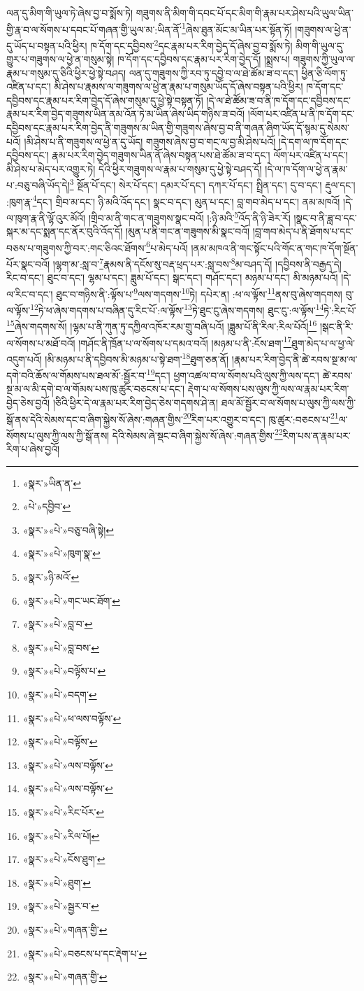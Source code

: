 ལན་དུ་མིག་གི་ཡུལ་ཏེ་ཞེས་བྱ་བ་སྨོས་ཏེ། གཟུགས་ནི་མིག་གི་དབང་པོ་དང་མིག་གི་རྣམ་པར་ཤེས་པའི་ཡུལ་ཡིན་གྱི་རྣ་བ་ལ་སོགས་པ་དབང་པོ་གཞན་གྱི་ཡུལ་མ་:ཡིན་ནོ་\footnote{«སྣར་»ཡིན་ན་}ཞེས་ཐུན་མོང་མ་ཡིན་པར་སྟོན་ཏོ། །གཟུགས་ལ་ཕྱེ་ན་དུ་ཡོད་པ་བསྟན་པའི་ཕྱིར། ཁ་དོག་དང་དབྱིབས་\footnote{«པེ་»དབྱིབ་}དང་རྣམ་པར་རིག་བྱེད་དོ་ཞེས་བྱ་བ་སྨོས་ཏེ། མིག་གི་ཡུལ་དུ་གྱུར་པ་གཟུགས་ལ་ཕྱེ་ན་གསུམ་སྟེ། ཁ་དོག་དང་དབྱིབས་དང་རྣམ་པར་རིག་བྱེད་དོ། །སྨྲས་པ། གཟུགས་ཀྱི་ཡུལ་ལ་རྣམ་པ་གསུམ་དུ་ཅིའི་ཕྱིར་ཕྱེ་སྟེ་བཤད། ལན་དུ་གཟུགས་ཀྱི་རབ་ཏུ་དབྱེ་བ་ལ་ཐེ་ཚོམ་ཟ་བ་དང་། ཕྱིན་ཅི་ལོག་ཏུ་འཛིན་པ་དང་། མི་ཤེས་པ་རྣམས་ལ་གཟུགས་ལ་ཕྱེ་ན་རྣམ་པ་གསུམ་ཡོད་དོ་ཞེས་བསྟན་པའི་ཕྱིར། ཁ་དོག་དང་དབྱིབས་དང་རྣམ་པར་རིག་བྱེད་དོ་ཞེས་གསུམ་དུ་ཕྱེ་སྟེ་བསྟན་ཏོ། །དེ་ལ་ཐེ་ཚོམ་ཟ་བ་ནི་ཁ་དོག་དང་དབྱིབས་དང་རྣམ་པར་རིག་བྱེད་གཟུགས་ཡིན་ནམ་འོན་ཏེ་མ་ཡིན་ཞེས་ཡིད་གཉིས་ཟ་བའོ། །ལོག་པར་འཛིན་པ་ནི་ཁ་དོག་དང་དབྱིབས་དང་རྣམ་པར་རིག་བྱེད་ནི་གཟུགས་མ་ཡིན་གྱི་གཟུགས་ཞེས་བྱ་བ་ནི་གཞན་ཞིག་ཡོད་དོ་སྙམ་དུ་སེམས་པའོ། །མི་ཤེས་པ་ནི་གཟུགས་ལ་ཕྱེ་ན་དུ་ཡོད། གཟུགས་ཞེས་བྱ་བ་གང་ལ་བྱ་མི་ཤེས་པའོ། །དེ་དག་ལ་ཁ་དོག་དང་དབྱིབས་དང་། རྣམ་པར་རིག་བྱེད་གཟུགས་ཡིན་ནོ་ཞེས་བསྟན་པས་ཐེ་ཚོམ་ཟ་བ་དང་། ལོག་པར་འཛིན་པ་དང་། མི་ཤེས་པ་མེད་པར་འགྱུར་ཏེ། དེའི་ཕྱིར་གཟུགས་ལ་རྣམ་པ་གསུམ་དུ་ཕྱེ་སྟེ་བཤད་དོ། །དེ་ལ་ཁ་དོག་ལ་ཕྱེ་ན་རྣམ་པ་:བཅུ་བཞི་ཡོད་དེ།\footnote{«སྣར་»«པེ་»བཅུ་བཞི་སྟེ།} སྔོན་པོ་དང་། སེར་པོ་དང་། དམར་པོ་དང་། དཀར་པོ་དང་། སྤྲིན་དང་། དུ་བ་དང་། རྡུལ་དང་། :ཁུག་རྣ་\footnote{«སྣར་»«པེ་»ཁུག་སྣ་}དང་། གྲིབ་མ་དང་། ཉི་མའི་འོད་དང་། སྣང་བ་དང་། མུན་པ་དང་། བླ་གབ་མེད་པ་དང་། ནམ་མཁའོ། །དེ་ལ་ཁུག་རྣ་ནི་ལྷོ་འུར་མོའོ། །གྲིབ་མ་ནི་གང་ན་གཟུགས་སྣང་བའོ། །:ཉི་མའི་\footnote{«སྣར་»ཉི་མའོ་}འོད་ནི་ཉི་ཟེར་རོ། །སྣང་བ་ནི་ཟླ་བ་དང་སྐར་མ་དང་སྨན་དང་ནོར་བུའི་འོད་དོ། །མུན་པ་ནི་གང་ན་གཟུགས་མི་སྣང་བའོ། །བླ་གབ་མེད་པ་ནི་ཐོགས་པ་དང་བཅས་པ་གཟུགས་ཀྱི་བར་:གང་ཅིའང་ཐོགས་\footnote{«སྣར་»«པེ་»གང་ཡང་ཐོག་}པ་མེད་པའོ། །ནམ་མཁའ་ནི་གང་སྟོང་པའི་གོང་ན་གང་ཁ་དོག་སྔོན་པོར་སྣང་བའོ། །ལྷག་མ་:སླ་བ་\footnote{«སྣར་»«པེ་»བླ་བ་}རྣམས་ནི་དངོས་སུ་བརྡ་ཕྲད་པར་:སླ་བས་\footnote{«སྣར་»«པེ་»བླ་བས་}མ་བཤད་དོ། །དབྱིབས་ནི་བརྒྱད་དེ། རིང་བ་དང་། ཐུང་བ་དང་། ལྷམ་པ་དང་། ཟླུམ་པོ་དང་། སྒང་དང་། གཤོང་དང་། མཉམ་པ་དང་། མི་མཉམ་པའོ། །དེ་ལ་རིང་བ་དང་། ཐུང་བ་གཉིས་ནི་:ལྟོས་པ་\footnote{«སྣར་»«པེ་»བལྟོས་པ་}ལས་གདགས་\footnote{«སྣར་»«པེ་»བདག་}ཏེ། དཔེར་ན། :ཕ་ལ་ལྟོས་\footnote{«སྣར་»«པེ་»ཕ་ལས་བལྟོས་}ནས་བུ་ཞེས་གདགས། བུ་ལ་ལྟོས་\footnote{«སྣར་»«པེ་»བལྟོས་}ཏེ་ཕ་ཞེས་གདགས་པ་བཞིན་དུ་རིང་པོ་:ལ་ལྟོས་\footnote{«སྣར་»«པེ་»ལས་བལྟོས་}ཏེ་ཐུང་ངུ་ཞེས་གདགས། ཐུང་ངུ་:ལ་ལྟོས་\footnote{«སྣར་»«པེ་»ལས་བལྟོས་}ཏེ་:རིང་པོ་\footnote{«སྣར་»«པེ་»རིང་པོར་}ཞེས་གདགས་སོ། །ལྷམ་པ་ནི་ཀུན་ཏུ་དཀྱིལ་འཁོར་རམ་གྲུ་བཞི་པའོ། །ཟླུམ་པོ་ནི་རིལ་:རིལ་པོའོ།\footnote{«སྣར་»«པེ་»རིལ་པོ།} །སྒང་ནི་རི་ལ་སོགས་པ་མཐོ་བའོ། །གཤོང་ནི་ཁྲོན་པ་ལ་སོགས་པ་དམའ་བའོ། །མཉམ་པ་ནི་:ངོས་ཐག་\footnote{«སྣར་»«པེ་»ངོས་ཐུག་}ཐུག་མེད་པ་ལ་ཕྱ་ལེ་འདུག་པའོ། །མི་མཉམ་པ་ནི་དབྱིབས་མི་མཉམ་པ་སྟེ་ཐག་\footnote{«སྣར་»«པེ་»ཐུག་}ཐུག་ཅན་ནོ། །རྣམ་པར་རིག་བྱེད་ནི་ཚེ་རབས་སྔ་མ་ལ་དགེ་བའི་ཆོས་ལ་གོམས་པས་ཐལ་མོ་:སྦྱོར་བ་\footnote{«སྣར་»«པེ་»སྦྱར་བ་}དང་། ཕྱག་འཚལ་བ་ལ་སོགས་པའི་ལུས་ཀྱི་ལས་དང་། ཚེ་རབས་སྔ་མ་ལ་མི་དགེ་བ་ལ་གོམས་པས་ཁུ་ཚུར་བཅངས་པ་དང་། རྡེག་པ་ལ་སོགས་པས་ལུས་ཀྱི་ལས་ལ་རྣམ་པར་རིག་བྱེད་ཅེས་བྱའོ། །ཅིའི་ཕྱིར་དེ་ལ་རྣམ་པར་རིག་བྱེད་ཅེས་གདགས་ཤེ་ན། ཐལ་མོ་སྦྱོར་བ་ལ་སོགས་པ་ལུས་ཀྱི་ལས་ཀྱི་སྒོ་ནས་དེའི་སེམས་དང་བ་ཞིག་སྐྱེས་སོ་ཞེས་:གཞན་གྱིས་\footnote{«སྣར་»«པེ་»གཞན་གྱི་}རིག་པར་འགྱུར་བ་དང་། ཁུ་ཚུར་:བཅངས་པ་\footnote{«སྣར་»«པེ་»བཅངས་པ་དང་རྡེག་པ་}ལ་སོགས་པ་ལུས་ཀྱི་ལས་ཀྱི་སྒོ་ནས། དེའི་སེམས་ཞེ་སྡང་བ་ཞིག་སྐྱེས་སོ་ཞེས་:གཞན་གྱིས་\footnote{«སྣར་»«པེ་»གཞན་གྱི་}རིག་པས་ན་རྣམ་པར་རིག་པ་ཞེས་བྱའོ། 